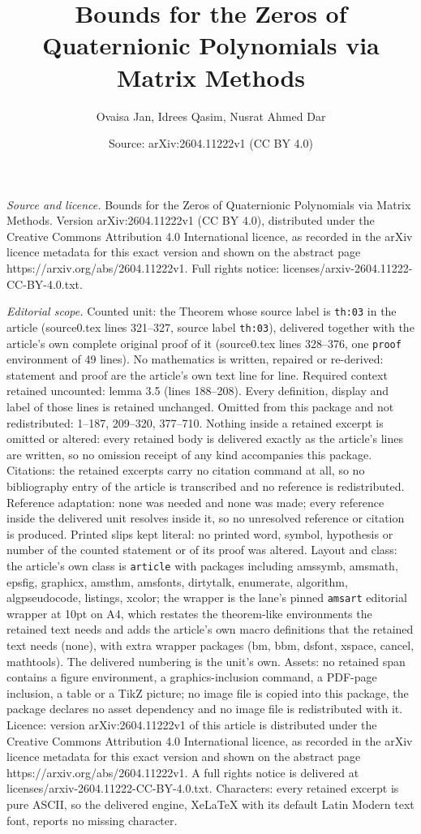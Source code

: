 \documentclass[10pt,a4paper]{amsart}
\title[Bounds for the Zeros of Quaternionic Polynomials via Matrix ]{Bounds for the Zeros of Quaternionic Polynomials via Matrix Methods}
\author{Ovaisa Jan, Idrees Qasim, Nusrat Ahmed Dar}
\date{Source: arXiv:2604.11222v1 (CC BY 4.0)}
\begin{document}
\maketitle

\noindent\emph{Source and licence.} Bounds for the Zeros of Quaternionic Polynomials via Matrix Methods. Version arXiv:2604.11222v1 (CC BY 4.0), distributed under the Creative Commons Attribution 4.0 International licence, as recorded in the arXiv licence metadata for this exact version and shown on the abstract page https://arxiv.org/abs/2604.11222v1. Full rights notice: licenses/arxiv-2604.11222-CC-BY-4.0.txt.\par\smallskip

\noindent\textit{Editorial scope.} Counted unit: the Theorem whose source label is \texttt{th:03} in the article (source0.tex lines 321--327, source label \texttt{th:03}), delivered together with the article's own complete original proof of it (source0.tex lines 328--376, one \texttt{proof} environment of 49 lines). No mathematics is written, repaired or re-derived: statement and proof are the article's own text line for line. Required context retained uncounted: lemma 3.5 (lines 188--208). Every definition, display and label of those lines is retained unchanged. Omitted from this package and not redistributed: 1--187, 209--320, 377--710. Nothing inside a retained excerpt is omitted or altered: every retained body is delivered exactly as the article's lines are written, so no omission receipt of any kind accompanies this package. Citations: the retained excerpts carry no citation command at all, so no bibliography entry of the article is transcribed and no reference is redistributed. Reference adaptation: none was needed and none was made; every reference inside the delivered unit resolves inside it, so no unresolved reference or citation is produced. Printed slips kept literal: no printed word, symbol, hypothesis or number of the counted statement or of its proof was altered. Layout and class: the article's own class is \texttt{article} with packages including amssymb, amsmath, epsfig, graphicx, amsthm, amsfonts, dirtytalk, enumerate, algorithm, algpseudocode, listings, xcolor; the wrapper is the lane's pinned \texttt{amsart} editorial wrapper at 10pt on A4, which restates the theorem-like environments the retained text needs and adds the article's own macro definitions that the retained text needs (none), with extra wrapper packages (bm, bbm, dsfont, xspace, cancel, mathtools). The delivered numbering is the unit's own. Assets: no retained span contains a figure environment, a graphics-inclusion command, a PDF-page inclusion, a table or a TikZ picture; no image file is copied into this package, the package declares no asset dependency and no image file is redistributed with it. Licence: version arXiv:2604.11222v1 of this article is distributed under the Creative Commons Attribution 4.0 International licence, as recorded in the arXiv licence metadata for this exact version and shown on the abstract page https://arxiv.org/abs/2604.11222v1. A full rights notice is delivered at licenses/arxiv-2604.11222-CC-BY-4.0.txt. Characters: every retained excerpt is pure ASCII, so the delivered engine, XeLaTeX with its default Latin Modern text font, reports no missing character.
\end{document}
